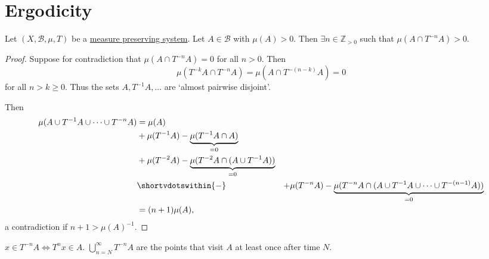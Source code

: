 \documentclass{article}
\begin{document}
\clearpage
\section{Ergodicity}
\begin{lemma}
  Let $(X, \mathcal{B}, \mu, T)$ be a \hyperlink{def:mps}{measure preserving system}.
  Let $A \in \mathcal{B}$ with $\mu(A) > 0$. Then $\exists n \in \mathbb{Z}_{> 0}$ such that $\mu(A \cap T^{-n} A) > 0$.
\end{lemma}
\begin{proof}
  Suppose for contradiction that $\mu(A \cap T^{-n}A) = 0$ for all $n > 0$.
  Then
  \begin{equation*}\mu(T^{-k}A \cap T^{-n} A) = \mu(A \cap T^{-(n-k)}A) = 0\end{equation*}
  for all $n > k \geq 0$.
  Thus the sets $A, T^{-1} A, \dotsc$ are `almost pairwise disjoint'.

  Then
  \begin{align*}
    \mu(A \cup T^{-1} A \cup \dotsb \cup T^{-n} A) &= \mu(A) \\
                                                   &+ \mu(T^{-1} A) - \underbrace{\mu(T^{-1}A \cap A)}_{=0} \\
                                                   &+ \mu(T^{-2} A) - \underbrace{\mu(T^{-2} A \cap (A \cup T^{-1} A))}_{=0} \\
                                                   &\shortvdotswithin{-}
                                                   &+ \mu(T^{-n} A) - \underbrace{\mu(T^{-n} A \cap (A \cup T^{-1} A \cup \dotsb \cup T^{-(n-1)} A))}_{=0} \\
                                                   &= (n+1) \mu(A),
  \end{align*}
  a contradiction if $n + 1 > \mu(A)^{-1}$.
\end{proof}
\begin{remark}
  $x \in T^{-n} A \iff T^n x \in A$. $\bigcup_{n=N}^\infty T^{-n} A$ are the points that visit $A$ at least once after time $N$.
\end{remark}
\end{document}
